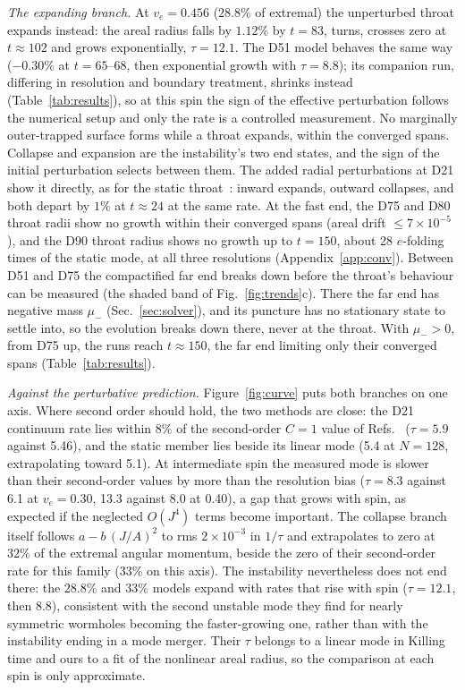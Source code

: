 \documentclass[twocolumn,floatfix,aps,prd,superscriptaddress,nofootinbib]{revtex4-2}
\begin{document}
\emph{The expanding branch.} At $v_e=0.456$ ($28.8\%$ of extremal) the unperturbed throat expands instead: the areal radius falls by $1.12\%$ by $t=83$, turns, crosses zero at $t\approx102$ and grows exponentially, $\tau=12.1$. The D51 model behaves the same way ($-0.30\%$ at $t=65$--68, then exponential growth with $\tau=8.8$); its companion run, differing in resolution and boundary treatment, shrinks instead (Table~\ref{tab:results}), so at this spin the sign of the effective perturbation follows the numerical setup and only the rate is a controlled measurement. No marginally outer-trapped surface forms while a throat expands, within the converged spans. Collapse and expansion are the instability's two end states, and the sign of the initial perturbation selects between them. The added radial perturbations at D21 show it directly, as for the static throat~\cite{shirokov2026c}: inward expands, outward collapses, and both depart by $1\%$ at $t\approx24$ at the same rate. At the fast end, the D75 and D80 throat radii show no growth within their converged spans (areal drift $\le7\times10^{-5}$), and the D90 throat radius shows no growth up to $t=150$, about 28 $e$-folding times of the static mode, at all three resolutions (Appendix~\ref{app:conv}). Between D51 and D75 the compactified far end breaks down before the throat's behaviour can be measured (the shaded band of Fig.~\ref{fig:trends}c). There the far end has negative mass $\mu_-$ (Sec.~\ref{sec:solver}), and its puncture has no stationary state to settle into, so the evolution breaks down there, never at the throat. With $\mu_->0$, from D75 up, the runs reach $t\approx150$, the far end limiting only their converged spans (Table~\ref{tab:results}).

\emph{Against the perturbative prediction.} Figure~\ref{fig:curve} puts both branches on one axis. Where second order should hold, the two methods are close: the D21 continuum rate lies within $8\%$ of the second-order $C=1$ value of Refs.~\cite{azad2023,azad2024} ($\tau=5.9$ against 5.46), and the static member lies beside its linear mode (5.4 at $N=128$, extrapolating toward 5.1). At intermediate spin the measured mode is slower than their second-order values by more than the resolution bias ($\tau=8.3$ against 6.1 at $v_e=0.30$, 13.3 against 8.0 at 0.40), a gap that grows with spin, as expected if the neglected $O(J^4)$ terms become important. The collapse branch itself follows $a-b\,(J/A)^2$ to rms $2\times10^{-3}$ in $1/\tau$ and extrapolates to zero at $32\%$ of the extremal angular momentum, beside the zero of their second-order rate for this family ($33\%$ on this axis). The instability nevertheless does not end there: the $28.8\%$ and $33\%$ models expand with rates that rise with spin ($\tau=12.1$, then 8.8), consistent with the second unstable mode they find for nearly symmetric wormholes becoming the faster-growing one, rather than with the instability ending in a mode merger. Their $\tau$ belongs to a linear mode in Killing time and ours to a fit of the nonlinear areal radius, so the comparison at each spin is only approximate.
\end{document}
